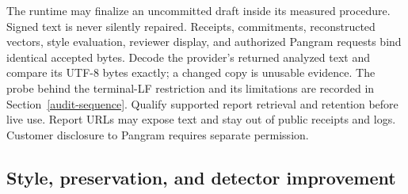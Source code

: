 The runtime may finalize an uncommitted draft inside its measured procedure.
Signed text is never silently repaired. Receipts, commitments, reconstructed
vectors, style evaluation, reviewer display, and authorized Pangram requests
bind identical accepted bytes. Decode the provider's returned analyzed text
and compare its UTF-8 bytes exactly; a changed copy is unusable evidence.
The probe behind the terminal-LF restriction and its limitations are recorded
in Section~\ref{audit-sequence}. Qualify supported report retrieval and retention
before live use. Report URLs may expose text and stay out of public receipts
and logs. Customer disclosure to Pangram requires separate permission.

\subsection{Style, preservation, and detector improvement}
\label{preservation-before-revision-rewards}
\label{transformation-and-improvement-utility}

